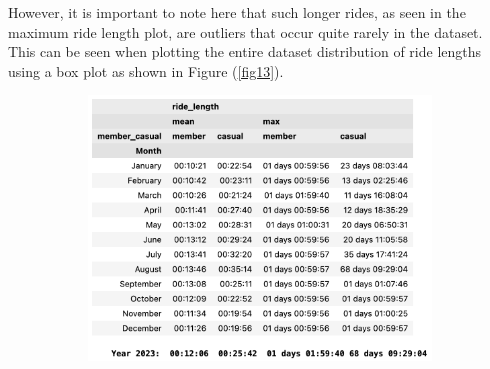 \documentclass[12pt]{article}
\begin{document}
\begin{itemize}
However, it is important to note here that such longer rides, as seen in the maximum ride length plot, are outliers that occur quite rarely in the dataset. This can be seen when plotting the entire dataset distribution of ride lengths using a box plot as shown in Figure (\ref{fig13}).  
\pagebreak
	\begin{figure}[h]
	\centering
		\begin{subfigure}[b]{0.55\textwidth}
   			\includegraphics[scale=0.6]{imgMeanMax2.png} 
			\caption{}
			\label{fig11_1}
		\end{subfigure}


\end{figure}
\end{itemize}
\end{document}
